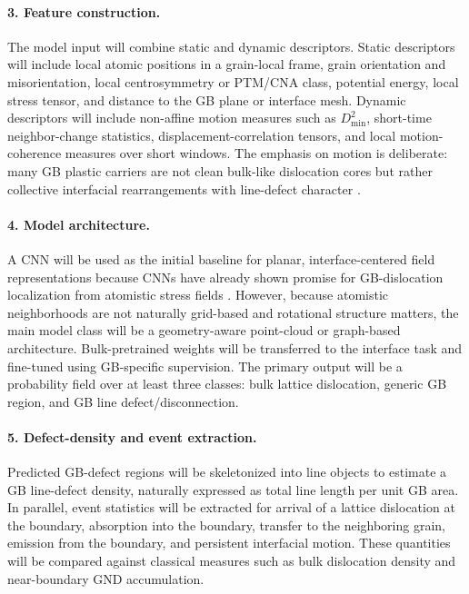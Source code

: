 \paragraph{3. Feature construction.}
The model input will combine static and dynamic descriptors. Static descriptors will include local atomic positions in a grain-local frame, grain orientation and misorientation, local centrosymmetry or PTM/CNA class, potential energy, local stress tensor, and distance to the GB plane or interface mesh. Dynamic descriptors will include non-affine motion measures such as $D^2_{\min}$, short-time neighbor-change statistics, displacement-correlation tensors, and local motion-coherence measures over short windows. The emphasis on motion is deliberate: many GB plastic carriers are not clean bulk-like dislocation cores but rather collective interfacial rearrangements with line-defect character \cite{Sharp2018}.

\paragraph{4. Model architecture.}
A CNN will be used as the initial baseline for planar, interface-centered field representations because CNNs have already shown promise for GB-dislocation localization from atomistic stress fields \cite{Noh2024}. However, because atomistic neighborhoods are not naturally grid-based and rotational structure matters, the main model class will be a geometry-aware point-cloud or graph-based architecture. Bulk-pretrained weights will be transferred to the interface task and fine-tuned using GB-specific supervision. The primary output will be a probability field over at least three classes: bulk lattice dislocation, generic GB region, and GB line defect/disconnection.

\paragraph{5. Defect-density and event extraction.}
Predicted GB-defect regions will be skeletonized into line objects to estimate a GB line-defect density, naturally expressed as total line length per unit GB area. In parallel, event statistics will be extracted for arrival of a lattice dislocation at the boundary, absorption into the boundary, transfer to the neighboring grain, emission from the boundary, and persistent interfacial motion. These quantities will be compared against classical measures such as bulk dislocation density and near-boundary GND accumulation.

